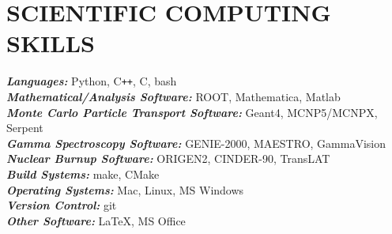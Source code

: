 \section{\small{SCIENTIFIC COMPUTING \\ SKILLS}}

{\sl\bf Languages:} \hfill Python, C\verb!++!, C, bash\\
{\sl\bf Mathematical/Analysis Software:} \hfill ROOT, Mathematica, Matlab\\ %
{\sl\bf Monte Carlo Particle Transport Software:} \hfill Geant4, MCNP5/MCNPX, Serpent\\
{\sl\bf Gamma Spectroscopy Software:} \hfill GENIE-2000, MAESTRO, GammaVision\\
{\sl\bf Nuclear Burnup Software:} \hfill ORIGEN2, CINDER-90, TransLAT\\
{\sl\bf Build Systems:} \hfill make, CMake\\
{\sl\bf Operating Systems:} \hfill Mac, Linux, MS Windows\\
{\sl\bf Version Control:} \hfill git\\
{\sl\bf Other Software:} \hfill \LaTeX, MS Office